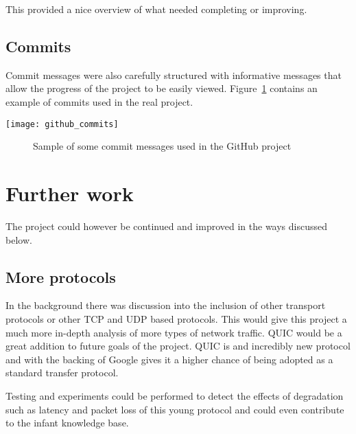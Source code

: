 This provided a nice overview of what needed completing or improving.

\subsection{Commits}
Commit messages were also carefully structured with informative messages that allow the progress of the project to be easily viewed. Figure~\ref{ref:githubCommits} contains an example of commits used in the real project.

\begin{center}
	\texttt{[image: github\_commits]}
	\begin{figure}[h]
		\caption{Sample of some commit messages used in the GitHub project}
		\label{ref:githubCommits}
	\end{figure}
\end{center}

\section{Further work}
The project could however be continued and improved in the ways discussed below.

\subsection{More protocols}
In the background there was discussion into the inclusion of other transport protocols or other TCP and UDP based protocols. This would give this project a much more in-depth analysis of more types of network traffic. QUIC would be a great addition to future goals of the project. QUIC is and incredibly new protocol and with the backing of Google gives it a higher chance of being adopted as a standard transfer protocol.

Testing and experiments could be performed to detect the effects of degradation such as latency and packet loss of this young protocol and could even contribute to the infant knowledge base.


